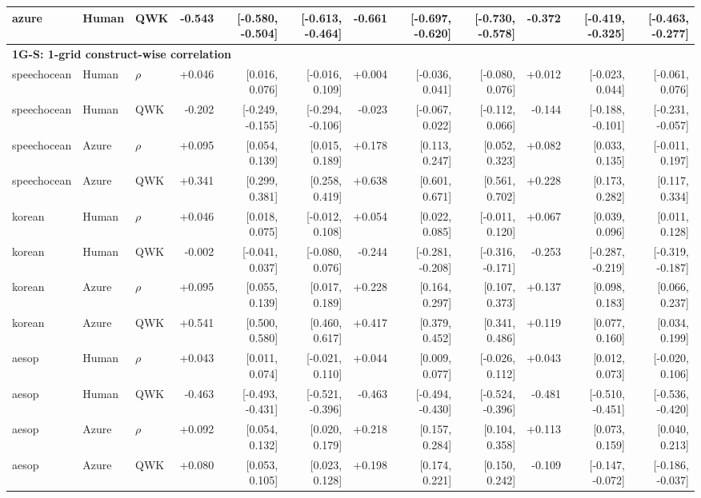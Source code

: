 \documentclass[10pt]{article}
\begin{document}
\begin{landscape}
\begin{longtable}{@{}lllrrrrrrrrr@{}}
azure & Human & QWK & -0.543 & [-0.580, -0.504] & [-0.613, -0.464] & -0.661 & [-0.697, -0.620] & [-0.730, -0.578] & -0.372 & [-0.419, -0.325] & [-0.463, -0.277]\\
\midrule\multicolumn{12}{l}{\textbf{1G-S: 1-grid construct-wise correlation}}\\*
speechocean & Human & $\rho$ & +0.046 & [0.016, 0.076] & [-0.016, 0.109] & +0.004 & [-0.036, 0.041] & [-0.080, 0.076] & +0.012 & [-0.023, 0.044] & [-0.061, 0.076]\\
speechocean & Human & QWK & -0.202 & [-0.249, -0.155] & [-0.294, -0.106] & -0.023 & [-0.067, 0.022] & [-0.112, 0.066] & -0.144 & [-0.188, -0.101] & [-0.231, -0.057]\\
speechocean & Azure & $\rho$ & +0.095 & [0.054, 0.139] & [0.015, 0.189] & +0.178 & [0.113, 0.247] & [0.052, 0.323] & +0.082 & [0.033, 0.135] & [-0.011, 0.197]\\
speechocean & Azure & QWK & +0.341 & [0.299, 0.381] & [0.258, 0.419] & +0.638 & [0.601, 0.671] & [0.561, 0.702] & +0.228 & [0.173, 0.282] & [0.117, 0.334]\\
\addlinespace[2pt]
korean & Human & $\rho$ & +0.046 & [0.018, 0.075] & [-0.012, 0.108] & +0.054 & [0.022, 0.085] & [-0.011, 0.120] & +0.067 & [0.039, 0.096] & [0.011, 0.128]\\
korean & Human & QWK & -0.002 & [-0.041, 0.037] & [-0.080, 0.076] & -0.244 & [-0.281, -0.208] & [-0.316, -0.171] & -0.253 & [-0.287, -0.219] & [-0.319, -0.187]\\
korean & Azure & $\rho$ & +0.095 & [0.055, 0.139] & [0.017, 0.189] & +0.228 & [0.164, 0.297] & [0.107, 0.373] & +0.137 & [0.098, 0.183] & [0.066, 0.237]\\
korean & Azure & QWK & +0.541 & [0.500, 0.580] & [0.460, 0.617] & +0.417 & [0.379, 0.452] & [0.341, 0.486] & +0.119 & [0.077, 0.160] & [0.034, 0.199]\\
\addlinespace[2pt]
aesop & Human & $\rho$ & +0.043 & [0.011, 0.074] & [-0.021, 0.110] & +0.044 & [0.009, 0.077] & [-0.026, 0.112] & +0.043 & [0.012, 0.073] & [-0.020, 0.106]\\
aesop & Human & QWK & -0.463 & [-0.493, -0.431] & [-0.521, -0.396] & -0.463 & [-0.494, -0.430] & [-0.524, -0.396] & -0.481 & [-0.510, -0.451] & [-0.536, -0.420]\\
aesop & Azure & $\rho$ & +0.092 & [0.054, 0.132] & [0.020, 0.179] & +0.218 & [0.157, 0.284] & [0.104, 0.358] & +0.113 & [0.073, 0.159] & [0.040, 0.213]\\
aesop & Azure & QWK & +0.080 & [0.053, 0.105] & [0.023, 0.128] & +0.198 & [0.174, 0.221] & [0.150, 0.242] & -0.109 & [-0.147, -0.072] & [-0.186, -0.037]\\

\end{longtable}
\end{landscape}
\end{document}
